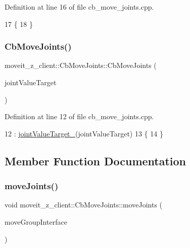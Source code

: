Definition at line 16 of file cb\+\_\+move\+\_\+joints.\+cpp.


\begin{DoxyCode}
17 \{
18 \}
\end{DoxyCode}
\mbox{\label{classmoveit__z__client_1_1CbMoveJoints_ae0f43ac05e5263161541eb6bc15fa457}} 
\subsubsection{\texorpdfstring{Cb\+Move\+Joints()}{CbMoveJoints()}\hspace{0.1cm}{\footnotesize\ttfamily [2/2]}}
{\footnotesize\ttfamily moveit\+\_\+z\+\_\+client\+::\+Cb\+Move\+Joints\+::\+Cb\+Move\+Joints (\begin{DoxyParamCaption}\item[{const std\+::map$<$ std\+::string, double $>$ \&}]{joint\+Value\+Target }\end{DoxyParamCaption})}



Definition at line 12 of file cb\+\_\+move\+\_\+joints.\+cpp.


\begin{DoxyCode}
12                                                                             : 
      \hyperlink{classmoveit__z__client_1_1CbMoveJoints_a0f52577dd2fccf25f36c4c93e733c0f4}{jointValueTarget\_}(jointValueTarget)
13 \{
14 \}
\end{DoxyCode}


\subsection{Member Function Documentation}
\mbox{\label{classmoveit__z__client_1_1CbMoveJoints_a4dcc7bcf0ed857d9d580d4700cdeb5db}} 
\subsubsection{\texorpdfstring{move\+Joints()}{moveJoints()}}
{\footnotesize\ttfamily void moveit\+\_\+z\+\_\+client\+::\+Cb\+Move\+Joints\+::move\+Joints (\begin{DoxyParamCaption}\item[{moveit\+::planning\+\_\+interface\+::\+Move\+Group\+Interface \&}]{move\+Group\+Interface }\end{DoxyParamCaption})\hspace{0.3cm}{\ttfamily [protected]}}



